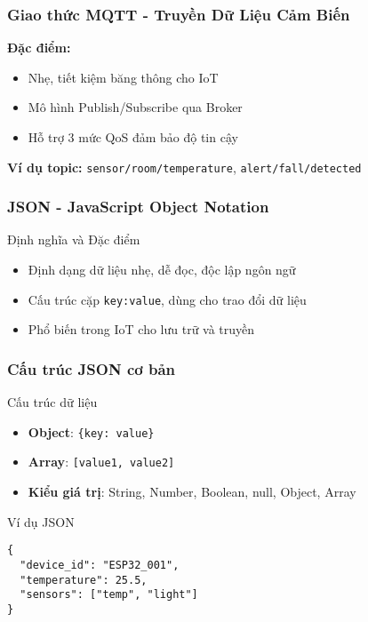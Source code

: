 \begin{frame}
\frametitle{Giao thức MQTT - Truyền Dữ Liệu Cảm Biến}

\textbf{Đặc điểm:}
\begin{itemize}
\item Nhẹ, tiết kiệm băng thông cho IoT
\item Mô hình Publish/Subscribe qua Broker
\item Hỗ trợ 3 mức QoS đảm bảo độ tin cậy
\end{itemize}

\textbf{Ví dụ topic:} \texttt{sensor/room/temperature}, \texttt{alert/fall/detected}
\end{frame}

\begin{frame}
\frametitle{JSON - JavaScript Object Notation}

\begin{block}{Định nghĩa và Đặc điểm}
\begin{itemize}
\item Định dạng dữ liệu nhẹ, dễ đọc, độc lập ngôn ngữ
\item Cấu trúc cặp \texttt{key:value}, dùng cho trao đổi dữ liệu
\item Phổ biến trong IoT cho lưu trữ và truyền
\end{itemize}
\end{block}

\end{frame}

\begin{frame}[fragile]
\frametitle{Cấu trúc JSON cơ bản}

\begin{block}{Cấu trúc dữ liệu}
\begin{itemize}
\item \textbf{Object}: \texttt{\{key: value\}}
\item \textbf{Array}: \texttt{[value1, value2]}
\item \textbf{Kiểu giá trị}: String, Number, Boolean, null, Object, Array
\end{itemize}
\end{block}

\begin{exampleblock}{Ví dụ JSON}
\begin{verbatim}
{
  "device_id": "ESP32_001",
  "temperature": 25.5,
  "sensors": ["temp", "light"]
}
\end{verbatim}
\end{exampleblock}
\end{frame}

